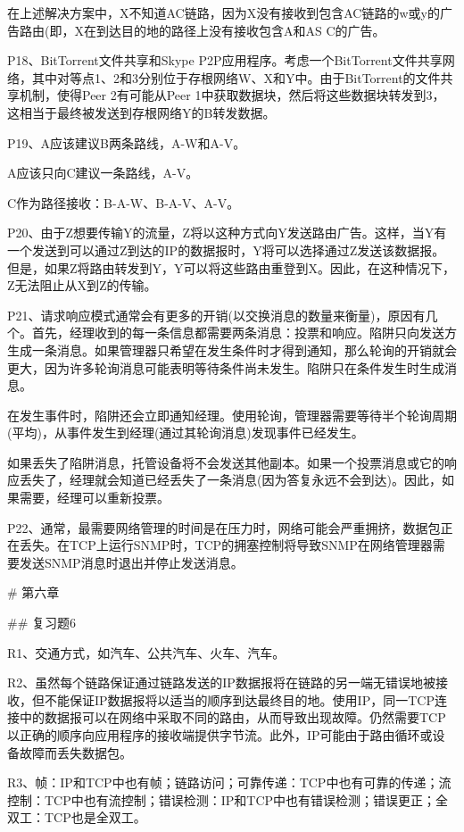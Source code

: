 \documentclass[11pt,UTF8,twoside]{article}
\begin{document}
	在上述解决方案中，X不知道AC链路，因为X没有接收到包含AC链路的w或y的广告路由(即，X在到达目的地的路径上没有接收包含A和AS C的广告。
	
	P18、BitTorrent文件共享和Skype P2P应用程序。考虑一个BitTorrent文件共享网络，其中对等点1、2和3分别位于存根网络W、X和Y中。由于BitTorrent的文件共享机制，使得Peer 2有可能从Peer 1中获取数据块，然后将这些数据块转发到3，这相当于最终被发送到存根网络Y的B转发数据。
	
	P19、A应该建议B两条路线，A-W和A-V。
	
	A应该只向C建议一条路线，A-V。
	
	C作为路径接收：B-A-W、B-A-V、A-V。
	
	P20、由于Z想要传输Y的流量，Z将以这种方式向Y发送路由广告。这样，当Y有一个发送到可以通过Z到达的IP的数据报时，Y将可以选择通过Z发送该数据报。但是，如果Z将路由转发到Y，Y可以将这些路由重登到X。因此，在这种情况下，Z无法阻止从X到Z的传输。
	
	P21、请求响应模式通常会有更多的开销(以交换消息的数量来衡量)，原因有几个。首先，经理收到的每一条信息都需要两条消息：投票和响应。陷阱只向发送方生成一条消息。如果管理器只希望在发生条件时才得到通知，那么轮询的开销就会更大，因为许多轮询消息可能表明等待条件尚未发生。陷阱只在条件发生时生成消息。
	
	在发生事件时，陷阱还会立即通知经理。使用轮询，管理器需要等待半个轮询周期(平均)，从事件发生到经理(通过其轮询消息)发现事件已经发生。
	
	如果丢失了陷阱消息，托管设备将不会发送其他副本。如果一个投票消息或它的响应丢失了，经理就会知道已经丢失了一条消息(因为答复永远不会到达)。因此，如果需要，经理可以重新投票。
	
	P22、通常，最需要网络管理的时间是在压力时，网络可能会严重拥挤，数据包正在丢失。在TCP上运行SNMP时，TCP的拥塞控制将导致SNMP在网络管理器需要发送SNMP消息时退出并停止发送消息。
	
	\newpage
\pagestyle{fancy}
\fancyhf{}  %
\pagestyle{fancy}
	
	# 第六章
	
	## 复习题6 
	
	R1、交通方式，如汽车、公共汽车、火车、汽车。
	
	R2、虽然每个链路保证通过链路发送的IP数据报将在链路的另一端无错误地被接收，但不能保证IP数据报将以适当的顺序到达最终目的地。使用IP，同一TCP连接中的数据报可以在网络中采取不同的路由，从而导致出现故障。仍然需要TCP以正确的顺序向应用程序的接收端提供字节流。此外，IP可能由于路由循环或设备故障而丢失数据包。
	
	R3、帧：IP和TCP中也有帧；链路访问；可靠传递：TCP中也有可靠的传递；流控制：TCP中也有流控制；错误检测：IP和TCP中也有错误检测；错误更正；全双工：TCP也是全双工。
	
\end{document}
